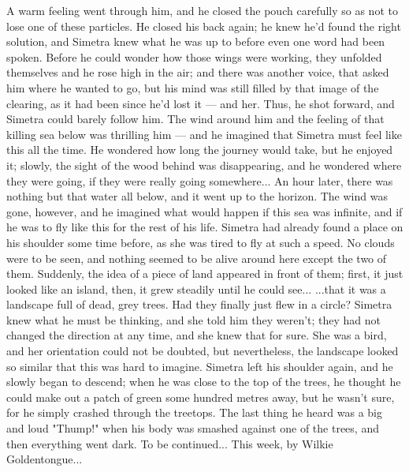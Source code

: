 A warm feeling went through him, and he closed the pouch carefully so as not to lose one of these particles. He closed his back again; he knew he'd found the right solution, and Simetra knew what he was up to before even one word had been spoken. 
Before he could wonder how those wings were working, they unfolded themselves and he rose high in the air; and there was another voice, that asked him where he wanted to go, but his mind was still filled by that image of the clearing, as it had been since he'd lost it --- and her. 
Thus, he shot forward, and Simetra could barely follow him. The wind around him and the feeling of that killing sea below was thrilling him --- and he imagined that Simetra must feel like this all the time. He wondered how long the journey would take, but he enjoyed it; slowly, the sight of the wood behind was disappearing, and he wondered where they were going, if they were really going somewhere...
An hour later, there was nothing but that water all below, and it went up to the horizon. The wind was gone, however, and he imagined what would happen if this sea was infinite, and if he was to fly like this for the rest of his life. Simetra had already found a place on his shoulder some time before, as she was tired to fly at such a speed. No clouds were to be seen, and nothing seemed to be alive around here except the two of them. 
Suddenly, the idea of a piece of land appeared in front of them; first, it just looked like an island, then, it grew steadily until he could see...
...that it was a landscape full of dead, grey trees. Had they finally just flew in a circle? Simetra knew what he must be thinking, and she told him they weren't; they had not changed the direction at any time, and she knew that for sure. She was a bird, and her orientation could not be doubted, but nevertheless, the landscape looked so similar that this was hard to imagine. 
Simetra left his shoulder again, and he slowly began to descend; when he was close to the top of the trees, he thought he could make out a patch of green some hundred metres away, but he wasn't sure, for he simply crashed through the treetops. The last thing he heard was a big and loud "Thump!" when his body was smashed against one of the trees, and then everything went dark. 
To be continued...
This week, by Wilkie Goldentongue...
